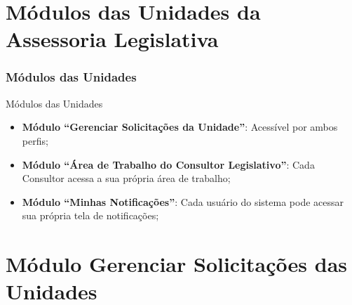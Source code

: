 \section{Módulos das Unidades da Assessoria Legislativa}
\begin{frame}
	\frametitle{Módulos das Unidades}
	
	\begin{alertblock}{Módulos das Unidades}
		\begin{itemize}
			\item \textbf{Módulo ``Gerenciar Solicitações da Unidade''}: Acessível por ambos perfis; 
			\item \textbf{Módulo ``Área de Trabalho do Consultor Legislativo''}: Cada Consultor acessa a sua própria área de trabalho;
			\item \textbf{Módulo ``Minhas Notificações''}: Cada usuário do sistema pode acessar sua própria tela de notificações;
		\end{itemize}
	\end{alertblock}	
\end{frame}
\section{Módulo Gerenciar Solicitações das Unidades}

